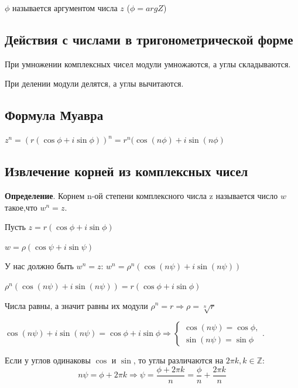 \documentclass[a4paper]{article}
\begin{document}
$\phi$ называется аргументом числа $z$ ($\phi = argZ$)

\subsection*{Действия с числами в тригонометрической форме}

При умножении комплексных чисел модули умножаются, а углы складываются.

При делении модули делятся, а углы вычитаются.



\subsection*{Формула Муавра}
 $z^n = (r(\cos \phi + i \sin \phi))^n = r^n ( \cos(n \phi) + i \sin(n \phi)$

\newpage \begin{center}\begin{Large}\end{Large}\end{center}

\subsection*{Извлечение корней из комплексных чисел
}
\textbf{Определение}. Корнем n-ой степени комплексного числа z называется число $w$ такое,\newline что $w^n = z$.


Пусть $z = r(\cos \phi + i \sin \phi)$

$w = \rho (\cos \psi + i \sin \psi)$

У нас должно быть $w^n = z$: $w^n = \rho^n (\cos (n \psi) + i \sin (n \psi))$

$\rho^n (\cos (n \psi) + i \sin (n \psi)) = r (\cos  \phi + i \sin \phi)$

Числа равны, а значит равны их модули $\rho^n = r \Rightarrow \rho = \sqrt[n]{r}$

$\cos (n \psi) + i \sin (n \psi) = \cos  \phi + i \sin \phi \Rightarrow \begin{cases}
\cos (n \psi) = \cos \phi,
\\
\sin (n \psi) = \sin \phi
\end{cases}$.

Если у углов одинаковы $\cos$ и $\sin$, то углы различаются на $2\pi k, k \in \mathbb{Z}$:
\begin{equation}
n \psi = \phi + 2\pi k \Rightarrow \psi = \frac{\phi + 2 \pi k}{n} = \frac{\phi}{n} + \frac{2 \pi k}{n}
\end{equation}
\end{document}
